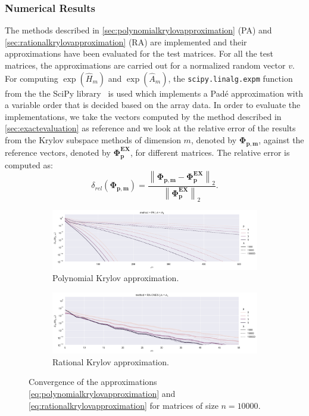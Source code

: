 \subsubsection*{Numerical Results}
The methods described in \autoref{sec:polynomialkrylovapproximation} (PA)
and \autoref{sec:rationalkrylovapproximation} (RA)
are implemented and their approximations have been evaluated for the test matrices.
For all the test matrices, the approximations are carried out for a normalized
random vector $v$.
For computing $\exp(\hat{H}_m)$ and $\exp(\hat{A}_m)$, the \texttt{scipy.linalg.expm}
function from the the SciPy library~\cite{SciPy2020} is used which implements a Padé
approximation with a variable order that is decided based on the array data.
In order to evaluate the implementations, we take the vectors computed by the method
described in \autoref{sec:exactevaluation} as reference and we look at the relative
error of the results from the Krylov subspace methods of dimension $m$, denoted by
$\mathbf{\Phi_{p, m}}$, against the reference vectors, denoted by $\mathbf{\Phi_p^{EX}}$,
for different matrices. The relative error is computed as:
\begin{equation*}
    \delta_{rel}(\mathbf{\Phi_{p, m}}) =
    \frac{\left\| \mathbf{\Phi_{p, m}} - \mathbf{\Phi_p^{EX}} \right\|_2}
    {\left\| \mathbf{\Phi_p^{EX}} \right\|_2}.
\end{equation*}

\begin{figure}[h!]
    \centering
    \begin{subfigure}[b]{.9\textwidth}
        \includegraphics[width=\textwidth]{img/krylovapproximation/cnvg_ps_PA_n10000.png}
        \caption{Polynomial Krylov approximation.}
        \label{fig:polynomialkrylovapproximationevaluation}
    \end{subfigure}
    \vfill
    \begin{subfigure}[b]{.9\textwidth}
        \includegraphics[width=\textwidth]{img/krylovapproximation/cnvg_ps_RA_n10000.png}
        \caption{Rational Krylov approximation.}
        \label{fig:rationalkrylovapproximationevaluation}
    \end{subfigure}
    \caption{
        Convergence of the approximations \eqref{eq:polynomialkrylovapproximation}
        and \eqref{eq:rationalkrylovapproximation} for matrices of size $n=10000$.
    }
    \label{fig:krylovapproximationevaluation}
\end{figure}

